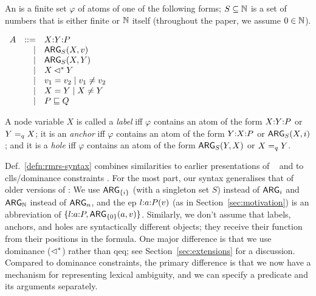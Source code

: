 \begin{definition}\label{defn:rmrs-syntax}
  An \emph{\rmrs} is a finite set $\varphi$ of atoms of one of the
  following forms; $S \subseteq \mathbb{N}$ is a set of numbers that is either
  finite or $\mathbb{N}$ itself (throughout the paper, we assume 
    $0 \in \mathbb{N}$).

$\begin{array}{rrll}
A &::= &\ep{X}{Y}{P} \\ %
&| &\ARG_S(X,v) \\ %
&| &\ARG_S(X,Y) \\ %
&| &X \dom Y \\ %
&| &v_1 = v_2 \;|\; v_1 \neq v_2 \\ %
&| &X = Y \;|\; X \neq Y \\ %
&| &P \spec Q %
\end{array}
$

A node variable $X$ is called a \emph{label} iff $\varphi$ contains an
atom of the form $X {:} Y {:} P$ or $Y =_q X$; it is an 
\emph{anchor} iff $\varphi$ contains an atom
of the form $Y {:} X {:} P$ or $\mathsf{ARG}_S(X,i)$; and it is a
\emph{hole} iff $\varphi$ contains an atom of the form $\mathsf{ARG}_S(Y,X)$
or $X =_q Y$.
\end{definition}

Def.~\ref{defn:rmrs-syntax} combines similarities to earlier
presentations of \rmrs\ \cite{copestake:2003,copestake:2007b} and to
{\sc clls}/dominance constraints \cite{egg:etal:2001}.  For the most
part, our syntax generalises that of older versions of \rmrs: We use
$\mathsf{ARG}_{\{i\}}$ (with a singleton set $S$) instead of $\mathsf{ARG}_i$ and
$\mathsf{ARG}_{\mathbb{N}}$ instead of $\mathsf{ARG}_n$, and the {\sc ep} $l {:} a {:} P(v)$ (as
in Section~\ref{sec:motivation}) is an abbreviation of
$\{l {:} a {:} P, \mathsf{ARG}_{\{0\}}(a,v)\}$.  Similarly, we don't assume
that labels, anchors, and holes are syntactically different objects;
they receive their function from their positions in the formula.  One
major difference is that we use dominance ($\lhd^*$) rather than qeq; see
Section~\ref{sec:extensions} for a discussion.  Compared to dominance
constraints, the primary difference is that we now have a mechanism
for representing lexical ambiguity, and we can specify a predicate and
its arguments separately.


